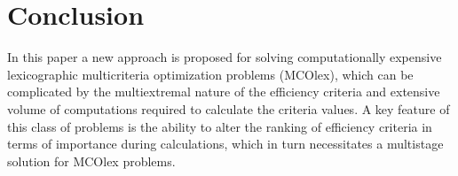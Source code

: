 \documentclass[smallextended]{svjour3}       %
\begin{document}
\begin{table}[ht]
\centering
\caption{Results of the numerical experiments to solve two-criteria four-dimensional MCO problems}
\label{tab:5}
\end{table}


\section{Conclusion}
\label{sec:6}

In this paper a new approach is proposed for solving computationally expensive lexicographic multicriteria optimization problems (MCOlex), which can be complicated by the multiextremal nature of the efficiency criteria and extensive volume of computations required to calculate the criteria values. A key feature of this class of problems is the ability to alter the ranking of efficiency criteria in terms of importance during calculations, which in turn necessitates a multistage solution for MCOlex problems.
\end{document}
